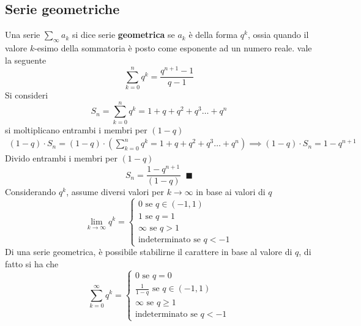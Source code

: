 \documentclass[10pt, letterpaper]{report}
\begin{document}
\subsection{Serie geometriche}
Una serie $\sum_{\infty}a_k$ si dice serie \textbf{geometrica} se
$a_k$ è della forma $q^k$, ossia quando il valore $k$-esimo della sommatoria
è posto come esponente ad un numero reale.\acc
\prop{} vale la seguente
$$ \sum_{k=0}^n q^k = \dfrac{q^{n+1}-1}{q-1}$$
\dimo{} Si consideri
$$ S_n =  \sum_{k=0}^n q^k = 1+q+q^2+q^3\dots + q^n$$
si moltiplicano entrambi i membri per $(1-q)$
$$\begin{matrix}
        \displaystyle(1-q)\cdot S_n =(1-q)\cdot
        (\sum_{k=0}^n q^k = 1+q+q^2+q^3\dots + q^n) \implies
        (1-q)\cdot S_n = 1-q^{n+1}
    \end{matrix}$$
Divido entrambi i membri per $(1-q)$
$$S_n = \dfrac{1-q^{n+1}}{(1-q)}\;\;\blacksquare$$
Considerando $q^k$, assume diversi valori per $k\rightarrow\infty$ in base
ai valori di $q$
$$\lim_{k\rightarrow\infty} q^k=\begin{cases}
        0\text{ se }q\in (-1,1) \\
        1\text{ se }q=1         \\
        \infty\text{ se }q>1    \\
        \text{indeterminato se }q<-1
    \end{cases} $$
Di una serie geometrica, è possibile stabilirne il carattere in base al
valore di $q$, di fatto si ha che
$$ \sum_{k=0}^\infty q^k = \begin{cases}
        0\text{ se }q=0                     \\
        \frac{1}{1-q}\text{ se }q\in (-1,1) \\
        \infty\text{ se }q\ge1              \\
        \text{indeterminato se }q<-1
    \end{cases}$$
\end{document}
